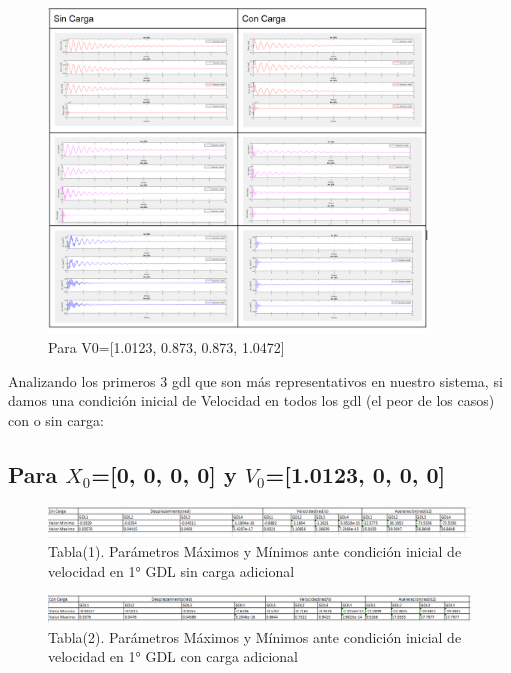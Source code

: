 \documentclass{aleph-revista}
\begin{document}
\begin{figure}[H]
    \centering
    \includegraphics[width=0.90\textwidth]{Imagenes/V0todos.png}
    \caption{Para V0=[1.0123, 0.873, 0.873, 1.0472]}
    \label{fig:etiqueta de la figura}
\end{figure}

Analizando los primeros 3 gdl que son más representativos en nuestro sistema, si damos una condición inicial de Velocidad en todos los gdl (el peor de los casos) con o sin carga:

\subsection{Para $X_0$=[0, 0, 0, 0] y $V_0$=[1.0123, 0, 0, 0]}

\begin{figure}[H]
    \centering
    \includegraphics[width=1\textwidth]{Imagenes/t1.png}
    \caption{Tabla(1). Parámetros Máximos y Mínimos ante condición inicial de velocidad en 1° GDL sin carga adicional
}
    \label{fig:etiqueta de la figura}
\end{figure}

\begin{figure}[H]
    \centering
    \includegraphics[width=1\textwidth]{Imagenes/t2.png}
    \caption{Tabla(2). Parámetros Máximos y Mínimos ante condición inicial de velocidad en 1° GDL con carga adicional}
    \label{fig:etiqueta de la figura}
\end{figure}
\end{document}
